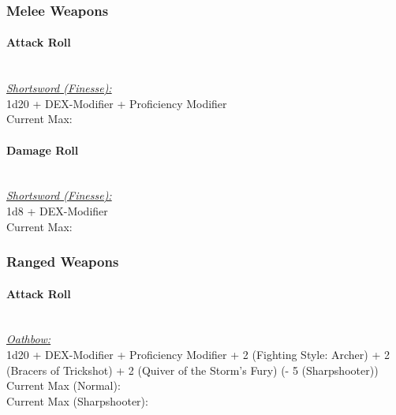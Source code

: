 \documentclass[letterpaper,openany,oneside,twocolumn]{book}
\begin{document}
\subsubsection*{Melee Weapons}
\paragraph*{Attack Roll}\hfill\\
\underline{\textit{Shortsword (Finesse):}}\\
1d20 + DEX-Modifier + Proficiency Modifier\\
\indent Current Max: 
\paragraph*{Damage Roll}\hfill\\
\underline{\textit{Shortsword (Finesse):}}\\
1d8 + DEX-Modifier\\
\indent Current Max: 
\subsubsection*{Ranged Weapons}
\paragraph*{Attack Roll}\hfill\\
\underline{\textit{Oathbow:}}\\
1d20 + DEX-Modifier + Proficiency Modifier + 2 (Fighting Style: Archer) + 2 (Bracers of Trickshot) + 2 (Quiver of the Storm's Fury) (- 5 (Sharpshooter)) \\
\indent Current Max (Normal):  \\
\indent Current Max (Sharpshooter): 
\end{document}
